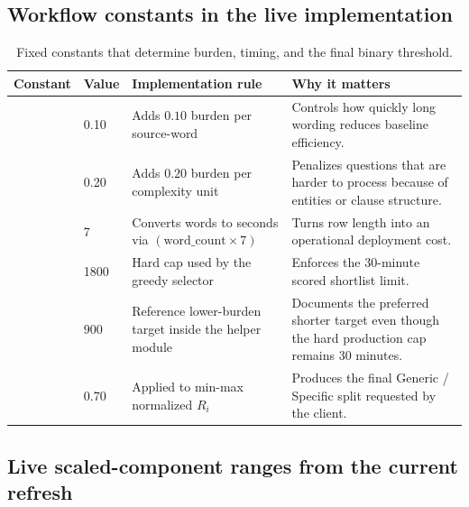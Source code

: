 \documentclass[12pt]{article}
\begin{document}
\subsection{Workflow constants in the live implementation}

\begin{table}[H]
\centering
\footnotesize
\begin{tabularx}{\textwidth}{L{0.22\textwidth} R{0.10\textwidth} Y Y}
\toprule
Constant & Value & Implementation rule & Why it matters \\
\midrule
{} & 0.10 & Adds $0.10$ burden per source-word & Controls how quickly long wording reduces baseline efficiency. \\
 & 0.20 & Adds $0.20$ burden per complexity unit & Penalizes questions that are harder to process because of entities or clause structure. \\
 & 7 & Converts words to seconds via $(\text{word\_count} \times 7)$ & Turns row length into an operational deployment cost. \\
 & 1800 & Hard cap used by the greedy selector & Enforces the 30-minute scored shortlist limit. \\
 & 900 & Reference lower-burden target inside the helper module & Documents the preferred shorter target even though the hard production cap remains 30 minutes. \\
 & 0.70 & Applied to min-max normalized $R_i$ & Produces the final Generic / Specific split requested by the client. \\
\bottomrule
\end{tabularx}
\caption{Fixed constants that determine burden, timing, and the final binary threshold.}
\end{table}

\subsection{Live scaled-component ranges from the current refresh}
\end{document}
